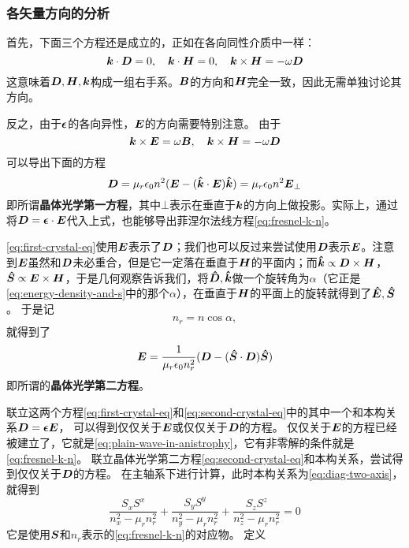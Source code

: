 \documentclass[UTF8, a4paper]{ctexart}
\begin{document}
\subsubsection{各矢量方向的分析}

首先，下面三个方程还是成立的，正如在各向同性介质中一样：
\[
    \vb*{k} \cdot \vb*{D} = 0, \quad \vb*{k} \cdot \vb*{H} = 0, \quad \vb*{k} \times \vb*{H} = - \omega \vb*{D}
\]
这意味着$\vb*{D}, \vb*{H}, \vb*{k}$构成一组右手系。$\vb*{B}$的方向和$\vb*{H}$完全一致，因此无需单独讨论其方向。

反之，由于$\vb*{\epsilon}$的各向异性，$\vb*{E}$的方向需要特别注意。
由于
\[
    \vb*{k} \times \vb*{E} = \omega \vb*{B}, \quad \vb*{k} \times \vb*{H} = - \omega \vb*{D}
\]
可以导出下面的方程
\begin{equation}
    \vb*{D} = \mu_r \epsilon_0 n^2 (\vb*{E} - (\vu*{k} \cdot \vb*{E}) \vu*{k}) = \mu_r \epsilon_0 n^2 \vb*{E}_{\bot}
    \label{eq:first-crystal-eq}
\end{equation}
即所谓\textbf{晶体光学第一方程}，其中$\bot$表示在垂直于$\vb*{k}$的方向上做投影。实际上，通过将$\vb*{D} = \vb*{\epsilon} \cdot \vb*{E}$代入上式，也能够导出菲涅尔法线方程\eqref{eq:fresnel-k-n}。

\eqref{eq:first-crystal-eq}使用$\vb*{E}$表示了$\vb*{D}$；我们也可以反过来尝试使用$\vb*{D}$表示$\vb*{E}$。注意到$\vb*{E}$虽然和$\vb*{D}$未必重合，但是它一定落在垂直于$\vb*{H}$的平面内；而$\vu*{k} \propto \vb*{D} \times \vb*{H}$，$\vu*{S} \propto \vb*{E} \times \vb*{H}$，于是几何观察告诉我们，将$\vu*{D},\vu*{k}$做一个旋转角为$\alpha$（它正是\eqref{eq:energy-density-and-s}中的那个$\alpha$），在垂直于$\vb*{H}$的平面上的旋转就得到了$\vu*{E}, \vu*{S}$。
于是记
\begin{equation}
    n_r = n \cos \alpha,
\end{equation}
就得到了
\begin{equation}
    \vb*{E} = \frac{1}{\mu_r \epsilon_0 n_r^2} (\vb*{D} - (\vu*{S} \cdot \vb*{D}) \vu*{S})
    \label{eq:second-crystal-eq}
\end{equation}
即所谓的\textbf{晶体光学第二方程}。

联立这两个方程\eqref{eq:first-crystal-eq}和\eqref{eq:second-crystal-eq}中的其中一个和本构关系$\vb*{D} = \vb*{\epsilon} \vb*{E}$，
可以得到仅仅关于$\vb*{E}$或仅仅关于$\vb*{D}$的方程。
仅仅关于$\vb*{E}$的方程已经被建立了，它就是\eqref{eq:plain-wave-in-anistrophy}，它有非零解的条件就是\eqref{eq:fresnel-k-n}。
联立晶体光学第二方程\eqref{eq:second-crystal-eq}和本构关系，尝试得到仅仅关于$\vb*{D}$的方程。
在主轴系下进行计算，此时本构关系为\eqref{eq:diag-two-axis}，
就得到
\begin{equation}
    \frac{S_x S^x}{n_x^2 - \mu_r n_r^2} + \frac{S_y S^y}{n_y^2 - \mu_r n_r^2} + \frac{S_z S^z}{n_z^2 - \mu_r n_r^2} = 0
\end{equation}
它是使用$\vb*{S}$和$n_r$表示的\eqref{eq:fresnel-k-n}的对应物。
定义
\end{document}

